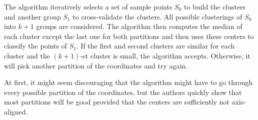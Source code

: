 \documentclass[11pt,letter]{article}
\begin{document}
The algorithm iteratively selects a set of sample points $S_0$ to build the clusters and another group $S_1$ to cross-validate the clusters. All possible clusterings of $S_0$ into $k+1$ groups are considered. The algorithm then computes the median of each cluster except the last one for both partitions and then uses these centers to classify the points of $S_1$. If the first and second clusters are similar for each cluster and the $(k+1)$-st cluster is small, the algorithm accepts. Otherwise, it will pick another partition of the coordinates and try again.  

At first, it might seem discouraging that the algorithm might have to go through every possible partition of the coordinates, but the authors quickly show that most partitions will be good provided that the centers are sufficiently not axis-aligned. 





 
 
\end{document}
